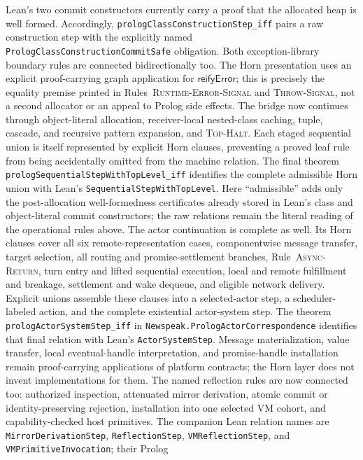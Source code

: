 \documentclass[11pt]{article}
\numberwithin{equation}{section}
\newcommand{\rulelabel}[1]{\textsc{#1}}
\begin{document}
Lean's two commit constructors currently carry a proof that the allocated heap
is well formed.  Accordingly,
\texttt{prologClassConstructionStep\_iff} pairs a raw construction step with
the explicitly named \texttt{PrologClassConstructionCommitSafe} obligation.
Both exception-library boundary rules are connected bidirectionally too.  The
Horn presentation uses an explicit proof-carrying graph application for
$\mathsf{reifyError}$; this is precisely the equality premise printed in
Rules~\rulelabel{Runtime-Error-Signal} and \rulelabel{Throw-Signal}, not a
second allocator or an appeal to Prolog side effects.
The bridge now continues through object-literal allocation, receiver-local
nested-class caching, tuple, cascade, and recursive pattern expansion, and
\rulelabel{Top-Halt}.  Each staged sequential union is itself represented by
explicit Horn clauses, preventing a proved leaf rule from being accidentally
omitted from the machine relation.  The final theorem
\texttt{prologSequentialStepWithTopLevel\_iff} identifies the complete
admissible Horn union with Lean's \texttt{SequentialStepWithTopLevel}.
Here ``admissible'' adds only the post-allocation well-formedness certificates
already stored in Lean's class and object-literal commit constructors; the raw
relations remain the literal reading of the operational rules above.
The actor continuation is complete as well.  Its Horn clauses cover all six
remote-representation cases, componentwise message transfer, target
selection, all routing and promise-settlement branches,
Rule~\rulelabel{Async-Return}, turn entry and lifted sequential execution,
local and remote fulfillment and breakage, settlement and wake dequeue, and
eligible network delivery.  Explicit unions assemble these clauses into a
selected-actor step, a scheduler-labeled action, and the complete existential
actor-system step.  The theorem
\texttt{prologActorSystemStep\_iff} in
\texttt{Newspeak.PrologActorCorrespondence} identifies that final relation
with Lean's \texttt{ActorSystemStep}.  Message materialization, value
transfer, local eventual-handle interpretation, and promise-handle
installation remain proof-carrying applications of platform contracts; the
Horn layer does not invent implementations for them.
The named reflection rules are now connected too: authorized inspection,
attenuated mirror derivation, atomic commit or identity-preserving rejection,
installation into one selected VM cohort, and capability-checked host
primitives.  The companion Lean relation names are
\texttt{MirrorDerivationStep}, \texttt{ReflectionStep},
\texttt{VMReflectionStep}, and \texttt{VMPrimitiveInvocation}; their Prolog
\end{document}
